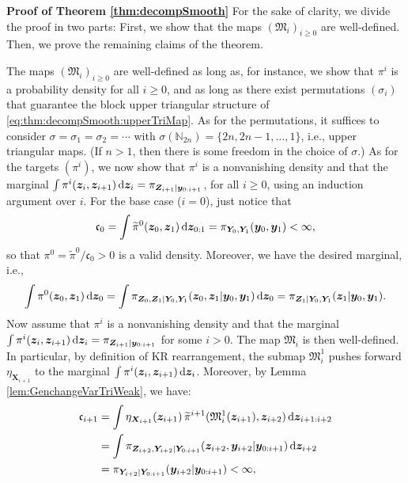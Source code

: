 \documentclass[twoside,11pt]{article}
\newcommand{\Xb}{\boldsymbol{X}}
\newcommand{\Yb}{\boldsymbol{Y}}
\newcommand{\yb}{\boldsymbol{y}}
\newcommand{\Zb}{\boldsymbol{Z}}
\newcommand{\zb}{\boldsymbol{z}}
\newcommand{\submap}{\mathfrak{M}}
\begin{document}
\noindent
{\bf Proof of Theorem \ref{thm:decompSmooth}} 
%
For the sake of clarity, we divide the proof in two parts:
First, we show that the maps $(\submap_i)_{i \ge 0}$ are well-defined.
Then, we prove the remaining claims of the theorem.
%

The maps $(\submap_i)_{i \ge 0}$ are well-defined as long as, for instance, 
we show that  $\pi^i$ is a   probability density %
%
for all $i\ge 0$, and as long
as there exist permutations $(\sigma_i)$ that guarantee the block
upper triangular structure of \eqref{eq:thm:decompSmooth:upperTriMap}.
As for the permutations, it suffices to consider 
$\sigma = \sigma_1 = \sigma_2 = \cdots$ with
$\sigma(\mathbb{N}_{2n}) = \{ 2n, 2n-1, \ldots, 1 \}$, i.e.,  upper
triangular maps. 
(If $n>1$, then there is some freedom in the choice of $\sigma$.)
As for the targets $(\pi^i)$, we now show that  
$\pi^i$ is a nonvanishing density
%
and that 
the marginal
$\int \pi^i(\zb_i,\zb_{i+1}) \, {\rm d}\zb_{i} =  
\pi_{\Zb_{i+1} \vert \yb_{0:i+1}}$, for
all $ i\ge 0$, using an induction argument over $i$.
%
%
%
%
%
%
%
%
%
%
%
%
%
%
%
For the base case ($i=0$), just notice that
\begin{equation} \label{thm:decompSmooth:c0}
\mathfrak{c}_0 = \int \widetilde{\pi}^0(\zb_0 , \zb_1) \, {\rm d}\zb_{0:1} = 
%
\pi_{\Yb_0,\Yb_1}(\yb_0,\yb_1) < \infty,
\end{equation}
so that
$\pi^0 = \widetilde{\pi}^0 / \mathfrak{c}_0 > 0$
is a valid density. %
%
%
%
Moreover, we have the desired marginal, i.e., %
\begin{equation}
  \int \pi^0(\zb_0 , \zb_{1}) \, {\rm d}\zb_0=
  \int \pi_{\Zb_0,\Zb_1\vert\Yb_0,\Yb_1}(\zb_0 , \zb_{1}\vert \yb_0, \yb_1) \, {\rm d}\zb_0 = 
  \pi_{\Zb_1\vert\Yb_0,\Yb_1}(\zb_{1}\vert \yb_0, \yb_1). 
\end{equation}
Now assume that $\pi^i$ is a nonvanishing density %
and that the marginal
$\int \pi^i(\zb_i,\zb_{i+1}) \, {\rm d}\zb_{i} =  
\pi_{\Zb_{i+1} \vert \yb_{0:i+1}}$ for some $i>0$. 
%
The map $\submap_i$ is then well-defined.
%
%
%
In particular, by definition of KR rearrangement,
the submap $\submap_i^1$ pushes forward 
$\eta_{\Xb_{i+1}}$ to the marginal 
$\int \pi^i(\zb_i,\zb_{i+1}) \, {\rm d}\zb_{i}$.
%
%
%
%
%
%
%
%
%
%
%
%
%
%
%
%
Moreover, by Lemma
\ref{lem:GenchangeVarTriWeak}, we have: %
\begin{align} \label{thm:decompSmooth:ck}
\mathfrak{c}_{i+1} &=
    \int \eta_{\Xb_{i+1}}(\zb_{i+1}) \,
    \widetilde{\pi}^{i+1}( \submap_{i}^1(\zb_{i+1}) , 
    \zb_{i+2})
    \, {\rm d}\zb_{i+1:i+2} \\ \nonumber
    &= 
    \int \pi_{\Zb_{i+2},\Yb_{i+2}\vert \Yb_{0:i+1}}(\zb_{i+2}, \yb_{i+2} \vert \yb_{0:i+1})
    \, {\rm d}\zb_{i+2} \\ \nonumber
    &=  
%
\pi_{\Yb_{i+2}\vert \Yb_{0:i+1}}(\yb_{i+2} \vert \yb_{0:i+1}) < \infty, \nonumber
\end{align}
\end{document}
